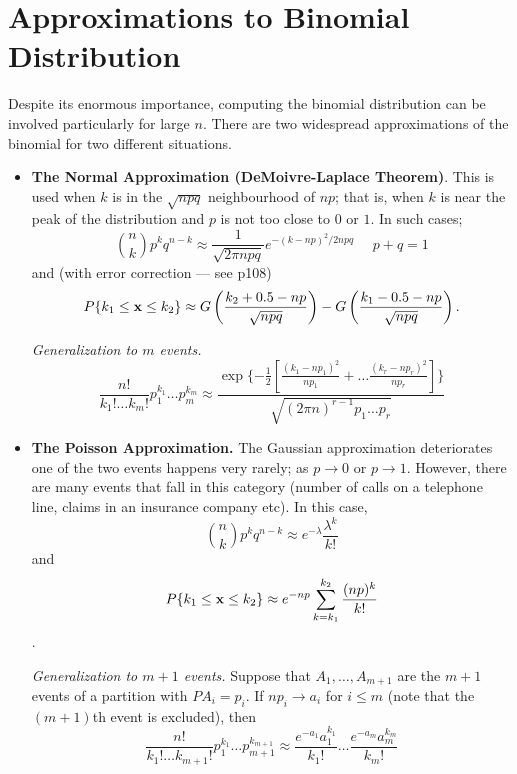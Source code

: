 \documentclass[a4paper, oneside]{book}
\begin{document}
\section{Approximations to Binomial Distribution}
Despite its enormous importance, computing the binomial distribution can be involved particularly for large $n$. There are two widespread approximations of the binomial for two different situations.
\begin{itemize}
\item \textbf{The Normal Approximation (DeMoivre-Laplace Theorem)}. This is used when $k$ is in the $\sqrt{npq}$ neighbourhood of $np$; that is, when $k$ is near the peak of the distribution and $p$ is not too close to $0$ or $1$. In such cases; $$\binom nk p^k q^{n-k} \approx \frac{1}{\sqrt{2\pi npq}} e^{-(k-np)^2/2npq}\,\,\,\,\,\,\,\, p+q=1$$
%
and (with error correction \---- see p108) $$P\{k_1\le \mathbf x \le k_2\} \approx G\left(\frac{k_2+0.5-np}{\sqrt{npq}}\right)-G\left(\frac{k_1-0.5-np}{\sqrt{npq}}\right).$$ 

\textit{Generalization to $m$ events.}
$$\frac{n!}{k_1!\hdots k_{m}!}p_1^{k_1}\hdots p^{k_{m}}_{m} \approx \frac{\exp \{-\frac{1}{2}\left[ \frac{(k_1-np_1)^2}{np_1} +  \hdots \frac{(k_r-np_r)^2}{np_r} \right]\}}{\sqrt{(2\pi n)^{r-1}p_1\hdots p_r}} $$

\item \textbf{The Poisson Approximation.} The Gaussian approximation deteriorates one of the two events happens very rarely; \ie as $p\to 0$ or $p\to 1$. However, there are many events that fall in this category (\eg number of calls on a telephone line, claims in an insurance company etc). In this case, $$\binom nk p^k q^{n-k} \approx e^{-\lambda} \frac{\lambda^k}{k!}$$ and $$P\{k_1\le \mathbf x \le k_2\} \approx  e^{-np} \sum\limits_{k=k_1}^{k_2} \frac{(np)^k}{k!}$$.

\textit{Generalization to $m+1$ events.} Suppose that $A_1,\hdots,A_{m+1}$ are the $m+1$ events of a partition with $P{A_i}=p_i$. If $np_i\to a_i$ for $i\le m$ (note that the $(m+1)$th event is excluded), then 
$$\frac{n!}{k_1!\hdots k_{m+1}!}p_1^{k_1}\hdots p^{k_{m+1}}_{m+1} \approx \frac{e^{-a_1}a_1^{k_1}}{k_1!} \hdots \frac{e^{-a_m}a_m^{k_m}}{k_m!}$$
\end{itemize}
\end{document}
